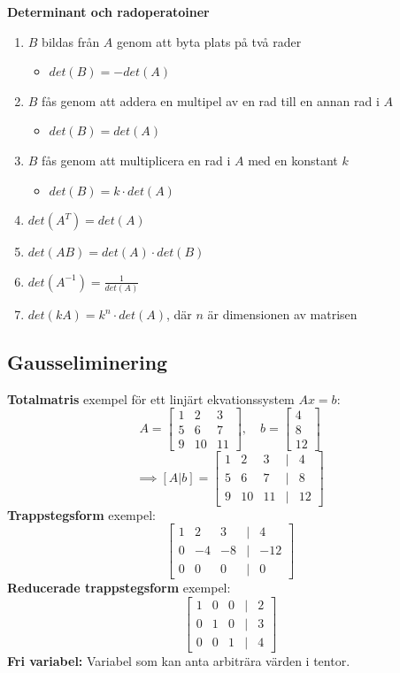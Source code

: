\documentclass[12pt,a4paper]{article}
\begin{document}
\textbf{Determinant och radoperatoiner}
\begin{enumerate}
    \item $B$ bildas från $A$ genom att byta plats på två rader
    \begin{itemize}
        \item $det(B) = -det(A)$
    \end{itemize}
    \item $B$ fås genom att addera en multipel av en rad till en annan rad i $A$
    \begin{itemize}
        \item $det(B) = det(A)$
    \end{itemize}
    \item $B$ fås genom att multiplicera en rad i $A$ med en konstant $k$
    \begin{itemize}
        \item $det(B) = k \cdot det(A)$
    \end{itemize}
    \item $det(A^T) = det(A)$
    \item $det(AB) = det(A) \cdot det(B)$
    \item $det(A^{-1}) = \frac{1}{det(A)}$
    \item $det(kA) = k^n \cdot det(A)$, där $n$ är dimensionen av matrisen
\end{enumerate}

\subsection{Gausseliminering}
\textbf{Totalmatris} exempel för ett linjärt ekvationssystem $Ax = b$:
\[
A = \begin{bmatrix}
    1 & 2 & 3 \\
5 & 6 & 7 \\
9 & 10 & 11 
\end{bmatrix}, \quad
b = \begin{bmatrix}
    4 \\
8 \\
12
\end{bmatrix}
\]
\[\implies
[A|b] =
\begin{bmatrix}
1 & 2 & 3 & | & 4 \\
5 & 6 & 7 & | & 8 \\
9 & 10 & 11 & | & 12
\end{bmatrix}
\]
\textbf{Trappstegsform} exempel:
\[
\begin{bmatrix}
1 & 2 & 3 & | & 4 \\
0 & -4 & -8 & | & -12 \\
0 & 0 & 0 & | & 0
\end{bmatrix}
\]
\textbf{Reducerade trappstegsform} exempel:
\[
\begin{bmatrix}
1 & 0 & 0 & | & 2 \\
0 & 1 & 0 & | & 3 \\
0 & 0 & 1 & | & 4
\end{bmatrix}
\]
\textbf{Fri variabel:} Variabel som kan anta arbiträra värden i tentor.
\end{document}
